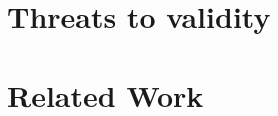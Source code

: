 \documentclass[conference]{IEEEtran}
\begin{document}



\section{Threats to validity} \label{sec:threat}


\section{Related Work}
\end{document}
